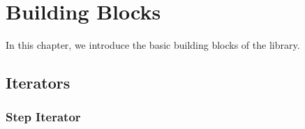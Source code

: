 %
%
%
%

\chapter{Building Blocks}
\label{chap:Building Blocks}

In this chapter, we introduce the basic building blocks of the library.

\section{Iterators}
\label{sec:Iterators}

\subsection{Step Iterator}
\label{sub:Step Iterator}

